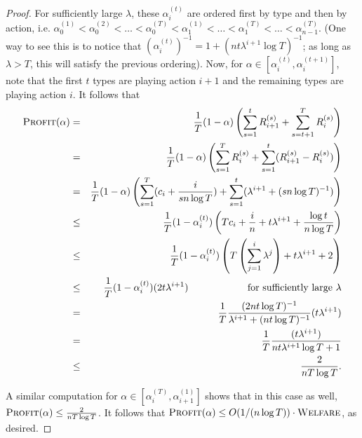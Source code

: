 \documentclass{article}
\newcommand{\jonnote}[1]{}
\newcommand{\Profit}{\textsc{Profit}}
\newcommand{\OWelfare}{\textsc{Welfare}}
\begin{document}
\begin{proof}
For sufficiently large $\lambda$, these $\alpha_{i}^{(t)}$ are ordered first by type and then by action, i.e. $\alpha_{0}^{(1)} < \alpha_{0}^{(2)} < \dots < \alpha_{0}^{(T)} < \alpha_{1}^{(1)} < \dots < \alpha_{1}^{(T)} < \dots < \alpha_{n-1}^{(T)}$. (One way to see this is to notice that $(\alpha_{i}^{(t)})^{-1} = 1 + (nt\lambda^{i+1}\log T)^{-1}$; as long as $\lambda > T$, this will satisfy the previous ordering). Now, for $\alpha \in [\alpha_{i}^{(t)}, \alpha_{i}^{(t+1)}]$, note that the first $t$ types are playing action $i+1$ and the remaining types are playing action $i$. It follows that
\begin{eqnarray*}
  \Profit(\alpha) &=& \frac1T (1-\alpha)\left(\sum_{s=1}^{t} R_{i+1}^{(s)} + \sum_{s=t+1}^{T} R_{i}^{(s)}\right) \\
  &=& \frac1T (1 - \alpha) \left(\sum_{s=1}^{T} R_{i}^{(s)} + \sum_{s=1}^{t} (R_{i+1}^{(s)} - R_{i}^{(s)}) \right) \\
  &=& \frac1T (1 - \alpha) \left(\sum_{s=1}^{T} (c_i + \frac{i}{sn\log T}) + \sum_{s=1}^{t} (\lambda^{i+1} + (sn\log T)^{-1}) \right) \\
  &\leq & \frac1T (1 - \alpha_{i}^{(t)})\left(Tc_i + \frac{i}{n} + t\lambda^{i+1} + \frac{\log t}{n\log T} \right)  \\
  &\leq & \frac1T (1 - \alpha_{i}^{(t)})\left(T\left(\sum_{j=1}^{i}\lambda^{j}\right) + t\lambda^{i+1} + 2 \right)  \\
  &\leq & \frac1T (1 - \alpha_{i}^{(t)})(2t\lambda^{i+1}) \hspace{20mm} \mbox{ for sufficiently large $\lambda$} \\ 
  &=& \frac1T \frac{(2nt\log T)^{-1}}{\lambda^{i+1} + (nt\log T)^{-1}}(t\lambda^{i+1}) \\
  &=& \frac1T \frac{(t\lambda^{i+1})}{nt\lambda^{i+1}\log T + 1} \\
  &\leq & \frac{2}{n T \log T}.
\end{eqnarray*}

\noindent
A similar computation for $\alpha \in [\alpha_i^{(T)}, \alpha_{i+1}^{(1)}]$ shows that in this case as well, $\Profit(\alpha) \leq \frac{2}{n T \log T}$. It follows that $\Profit(\alpha) \leq O(1/(n\log T))\cdot \OWelfare$, as desired.


\end{proof}


\end{document}

